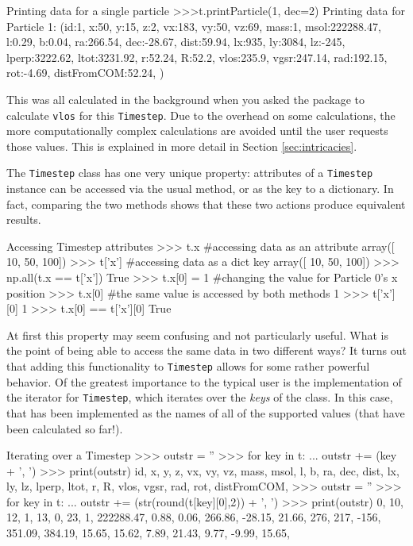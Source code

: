 \documentclass{article}
\begin{document}
\begin{codelisting}{Printing data for a single particle}
>>>t.printParticle(1, dec=2)
Printing data for Particle 1:
(id:1, x:50, y:15, z:2, vx:183, vy:50, vz:69, mass:1, msol:222288.47, 
l:0.29, b:0.04, ra:266.54, dec:-28.67, dist:59.94, lx:935, ly:3084, 
lz:-245, lperp:3222.62, ltot:3231.92, r:52.24, R:52.2, vlos:235.9, 
vgsr:247.14, rad:192.15, rot:-4.69, distFromCOM:52.24, )
\end{codelisting}

This was all calculated in the background when you asked the package to calculate \verb!vlos! for this \verb!Timestep!. Due to the overhead on some calculations, the more computationally complex calculations are avoided until the user requests those values. This is explained in more detail in Section \ref{sec:intricacies}. 

The \verb!Timestep! class has one very unique property: attributes of a \verb!Timestep! instance can be accessed via the usual method, or as the key to a dictionary. In fact, comparing the two methods shows that these two actions produce equivalent results. \\

\begin{codelisting}{Accessing Timestep attributes}
>>> t.x #accessing data as an attribute
array([ 10,  50, 100])
>>> t['x'] #accessing data as a dict key
array([ 10,  50, 100])
>>> np.all(t.x == t['x'])
True
>>> t.x[0] = 1 #changing the value for Particle 0's x position
>>> t.x[0] #the same value is accessed by both methods
1
>>> t['x'][0]
1
>>> t.x[0] == t['x'][0]
True
\end{codelisting}

At first this property may seem confusing and not particularly useful. What is the point of being able to access the same data in two different ways? It turns out that adding this functionality to \verb!Timestep! allows for some rather powerful behavior. Of the greatest importance to the typical user is the implementation of the iterator for \verb!Timestep!, which iterates over the \textit{keys} of the class. In this case, that has been implemented as the names of all of the supported values (that have been calculated so far!).\\

\begin{codelisting}{Iterating over a Timestep}
>>> outstr = ''
>>> for key in t:
...     outstr += (key + ', ')
>>> print(outstr)
id, x, y, z, vx, vy, vz, mass, msol, l, b, ra, dec, dist, lx, ly, 
lz, lperp, ltot, r, R, vlos, vgsr, rad, rot, distFromCOM, 
>>> outstr = ''
>>> for key in t:
...	outstr += (str(round(t[key][0],2)) + ', ')
>>> print(outstr)
0, 10, 12, 1, 13, 0, 23, 1, 222288.47, 0.88, 0.06, 266.86, -28.15, 21.66, 
276, 217, -156, 351.09, 384.19, 15.65, 15.62, 7.89, 21.43, 9.77, -9.99,
15.65,
\end{codelisting}
\end{document}

